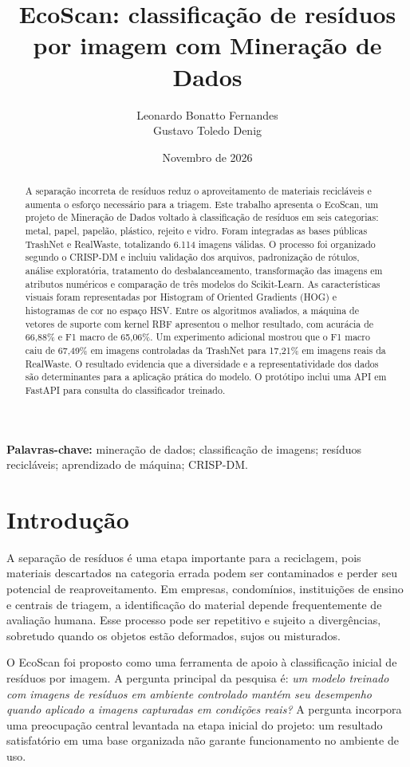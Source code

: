 \documentclass[11pt,a4paper]{article}
\title{\textbf{EcoScan: classificação de resíduos por imagem com Mineração de Dados}}
\author{Leonardo Bonatto Fernandes \\ Gustavo Toledo Denig}
\date{Novembro de 2026}
\begin{document}
\maketitle

\begin{abstract}
A separação incorreta de resíduos reduz o aproveitamento de materiais recicláveis e aumenta o esforço necessário para a triagem. Este trabalho apresenta o EcoScan, um projeto de Mineração de Dados voltado à classificação de resíduos em seis categorias: metal, papel, papelão, plástico, rejeito e vidro. Foram integradas as bases públicas TrashNet e RealWaste, totalizando 6.114 imagens válidas. O processo foi organizado segundo o CRISP-DM e incluiu validação dos arquivos, padronização de rótulos, análise exploratória, tratamento do desbalanceamento, transformação das imagens em atributos numéricos e comparação de três modelos do Scikit-Learn. As características visuais foram representadas por Histogram of Oriented Gradients (HOG) e histogramas de cor no espaço HSV. Entre os algoritmos avaliados, a máquina de vetores de suporte com kernel RBF apresentou o melhor resultado, com acurácia de 66,88\% e F1 macro de 65,06\%. Um experimento adicional mostrou que o F1 macro caiu de 67,49\% em imagens controladas da TrashNet para 17,21\% em imagens reais da RealWaste. O resultado evidencia que a diversidade e a representatividade dos dados são determinantes para a aplicação prática do modelo. O protótipo inclui uma API em FastAPI para consulta do classificador treinado.
\end{abstract}

\noindent\textbf{Palavras-chave:} mineração de dados; classificação de imagens; resíduos recicláveis; aprendizado de máquina; CRISP-DM.

\section{Introdução}

A separação de resíduos é uma etapa importante para a reciclagem, pois materiais descartados na categoria errada podem ser contaminados e perder seu potencial de reaproveitamento. Em empresas, condomínios, instituições de ensino e centrais de triagem, a identificação do material depende frequentemente de avaliação humana. Esse processo pode ser repetitivo e sujeito a divergências, sobretudo quando os objetos estão deformados, sujos ou misturados.

O EcoScan foi proposto como uma ferramenta de apoio à classificação inicial de resíduos por imagem. A pergunta principal da pesquisa é: \textit{um modelo treinado com imagens de resíduos em ambiente controlado mantém seu desempenho quando aplicado a imagens capturadas em condições reais?} A pergunta incorpora uma preocupação central levantada na etapa inicial do projeto: um resultado satisfatório em uma base organizada não garante funcionamento no ambiente de uso.
\end{document}

